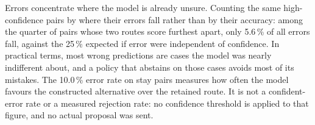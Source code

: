 \documentclass[a4paper,conference]{IEEEtran}
\begin{document}
Errors concentrate where the model is already unsure. Counting the same
high-confidence pairs by where their errors fall rather than by their
accuracy: among the quarter of pairs whose two routes score furthest
apart, only 5.6\,\% of all errors fall, against the 25\,\% expected if
error were independent of confidence. In practical terms, most wrong predictions are cases the
model was nearly indifferent about, and a policy that abstains on those
cases avoids most of its mistakes.
The 10.0\,\% error rate on stay pairs measures how often the model
favours the constructed alternative over the retained route. It is not
a confident-error rate or a measured rejection rate: no confidence
threshold is applied to that figure, and no actual proposal was sent.
\end{document}
